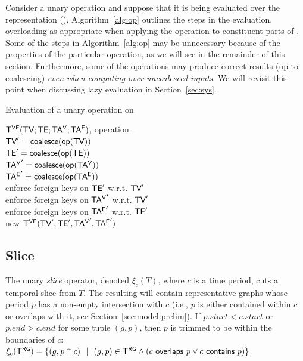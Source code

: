 Consider a unary operation \op and suppose that it is being evaluated
over the \ve representation \op(\tve).  Algorithm~\ref{alg:op}
outlines the steps in the evaluation, overloading \opp as appropriate
when applying the operation to constituent parts of \tve.  Some of the
steps in Algorithm~\ref{alg:op} may be unnecessary because of the
properties of the particular operation, as we will see in the
remainder of this section.  Furthermore, some of the operations may
produce correct results (up to coalescing) {\em even when computing
  over uncoalesced inputs}.  We will revisit this point when
discussing lazy evaluation in Section~\ref{sec:sys}.

\begin{algorithm}[h!]
\caption{Evaluation of a unary operation on \tve}
\begin{algorithmic}[1]
\REQUIRE \tg $\mathsf{T^{VE}} (\textsf{TV}; \textsf{TE}; \mathsf{TA^{V}}; \mathsf{TA^{E}})$, operation .\\
\STATE  $\textsf{TV}' = \textsf{coalesce} (\textsf{op}(\textsf{TV}))$\\
\STATE  $\textsf{TE}' = \textsf{coalesce} (\textsf{op}(\textsf{TE}))$\\
\STATE  $\mathsf{TA^{V}}' = \textsf{coalesce} (\textsf{op}(\mathsf{TA^{V}}))$\\
\STATE  $\mathsf{TA^{E}}' = \textsf{coalesce} (\textsf{op}(\mathsf{TA^{E}}))$\\
\STATE  enforce foreign keys on $\textsf{TE}'$ w.r.t. $\textsf{TV}'$\\
\STATE  enforce foreign keys on $\mathsf{TA^{V}}'$ w.r.t. $\textsf{TV}'$\\
\STATE  enforce foreign keys on $\mathsf{TA^{E}}'$ w.r.t. $\textsf{TE}'$\\
\RETURN new $\mathsf{T^{VE}} (\textsf{TV}', \textsf{TE}', \mathsf{TA^{V}}', \mathsf{TA^{E}}')$\\
\end{algorithmic}
\label{alg:op}
\end{algorithm}

\subsection{Slice}
\label{sec:algebra:slice}

The unary {\em slice} operator, denoted $\xi_c (T)$, where $c$ is a
time period, cuts a temporal slice from $T$.  The resulting \tg will
contain representative graphs whose period $p$ has a non-empty
intersection with $c$ (i.e., $p$ is either contained within $c$ or
overlaps with it, see Section~\ref{sec:model:prelim}).  If $p.start <
c.start$ or $p.end > c.end$ for some tuple $(g, p)$, then $p$ is
trimmed to be within the boundaries of $c$: $\xi_c (\mathsf{T^{RG}}) = \{ (g, p
\cap c)~~|~~(g, p) \in \mathsf{T^{RG}} \wedge (c~\mathsf{overlaps}~p \vee
c~\mathsf{contains}~p)\}$.

